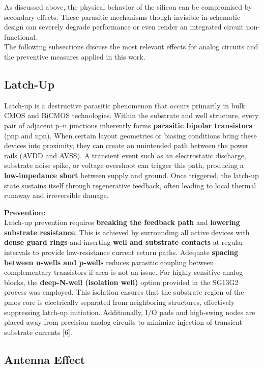 \documentclass[
  11pt,
  a4paper,
  oneside]{scrbook}
\begin{document}
As discussed above, the physical behavior of the silicon can be
compromised by secondary effects. These parasitic mechanisms though
invisible in schematic design can severely degrade performance or even
render an integrated circuit non-functional.\\
The following subsections discuss the most relevant effects for analog
circuits and the preventive measures applied in this work.

\subsection{Latch-Up}\label{latch-up}

Latch-up is a destructive parasitic phenomenon that occurs primarily in
bulk CMOS and BiCMOS technologies. Within the substrate and well
structure, every pair of adjacent p--n junctions inherently forms
\textbf{parasitic bipolar transistors} (pnp and npn). When certain
layout geometries or biasing conditions bring these devices into
proximity, they can create an unintended path between the power rails
(AVDD and AVSS). A transient event such as an electrostatic discharge,
substrate noise spike, or voltage overshoot can trigger this path,
producing a \textbf{low-impedance short} between supply and ground. Once
triggered, the latch-up state sustains itself through regenerative
feedback, often leading to local thermal runaway and irreversible
damage.

\textbf{Prevention:}\\
Latch-up prevention requires \textbf{breaking the feedback path} and
\textbf{lowering substrate resistance}. This is achieved by surrounding
all active devices with \textbf{dense guard rings} and inserting
\textbf{well and substrate contacts} at regular intervals to provide
low-resistance current return paths. Adequate \textbf{spacing between
n-wells and p-wells} reduces parasitic coupling between complementary
transistors if area is not an issue. For highly sensitive analog blocks,
the \textbf{deep-N-well (isolation well)} option provided in the SG13G2
process was employed. This isolation ensures that the substrate region
of the pmos core is electrically separated from neighboring structures,
effectively suppressing latch-up initiation. Additionally, I/O pads and
high-swing nodes are placed away from precision analog circuits to
minimize injection of transient substrate currents {[}6{]}.

\subsection{Antenna Effect}\label{antenna-effect}
\end{document}
